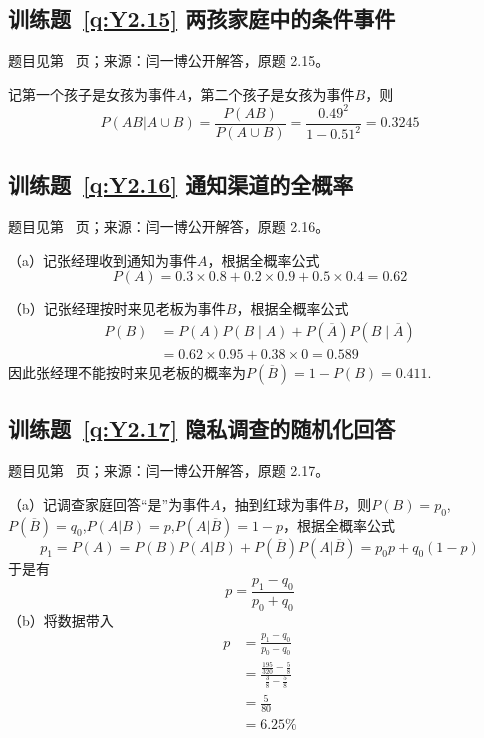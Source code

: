 \documentclass[UTF8,12pt,a4paper,fontset=fandol]{ctexbook}
\begin{document}
\subsection*{训练题~\ref{q:Y2.15} 两孩家庭中的条件事件}\label{a:Y2.15}{\small 题目见第~\pageref{q:Y2.15} 页；来源：闫一博公开解答，原题 2.15。}
\begin{solve}
记第一个孩子是女孩为事件$A$，第二个孩子是女孩为事件$B$，则
\[P(AB|A \cup B) = \frac{{P(AB)}}{{P(A \cup B)}} = \frac{{{{0.49}^2}}}{{1 - {{0.51}^2}}} = 0.3245\]
\end{solve}

\subsection*{训练题~\ref{q:Y2.16} 通知渠道的全概率}\label{a:Y2.16}{\small 题目见第~\pageref{q:Y2.16} 页；来源：闫一博公开解答，原题 2.16。}
\begin{solve}
（a）记张经理收到通知为事件$A$，根据全概率公式
\[P(A) = 0.3 \times 0.8 + 0.2 \times 0.9 + 0.5 \times 0.4 = 0.62\]

（b）记张经理按时来见老板为事件$B$，根据全概率公式
\[\begin{aligned}P(B)&=P(A)P(B\mid A)+P(\overline A)P(B\mid\overline A)\\&=0.62\times0.95+0.38\times0=0.589\end{aligned}\]
因此张经理不能按时来见老板的概率为$P(\overline{B})=1-P(B)=0.411$.
\end{solve}

\subsection*{训练题~\ref{q:Y2.17} 隐私调查的随机化回答}\label{a:Y2.17}{\small 题目见第~\pageref{q:Y2.17} 页；来源：闫一博公开解答，原题 2.17。}
\begin{solve}
（a）记调查家庭回答“是”为事件$A$，抽到红球为事件$B$，则$P(B)=p_0$,$P(\overline{B})=q_0$,$P(A|B)=p$,$P(A|\overline{B})=1-p$，根据全概率公式
\[{p_1} = P(A) = P(B)P(A|B) + P(\overline B )P(A|\overline B ) = {p_0}p + {q_0}(1 - p)\]
于是有
\[p = \frac{{{p_1} - {q_0}}}{{{p_0} + {q_0}}}\]
（b）将数据带入
\[\begin{aligned}p &= \frac{{{p_1} - {q_0}}}{{{p_0} - {q_0}}} \\&= \frac{{\frac{{195}}{{320}} - \frac{5}{8}}}{{\frac{3}{8} - \frac{5}{8}}} \\&= \frac{5}{{80}} \\&= 6.25\% \end{aligned}\]
\end{solve}
\end{document}
